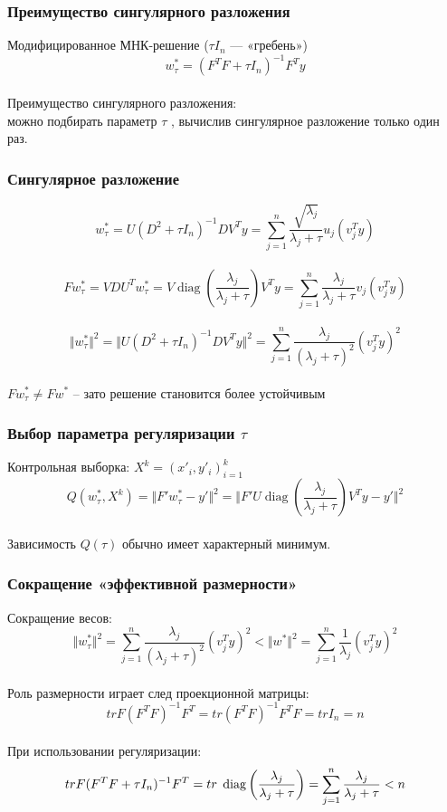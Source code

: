 \documentclass[10pt]{beamer}
\begin{document}
\begin{frame}\frametitle{Преимущество сингулярного разложения}
Модифицированное МНК-решение ($\tau I_n$ — «гребень»)\\
$$w^*_{\tau} = (F^TF + \tau I_n)^{-1}F^Ty$$\\
Преимущество сингулярного разложения:\\
можно подбирать параметр $\tau$ , вычислив сингулярное разложение только один раз.
\end{frame}

\begin{frame}\frametitle{Сингулярное разложение}
$$w_{\tau}^*= U(D^2 + \tau I_n)^{-1}DV^Ty = \sum\limits_{j=1}^n \frac{\sqrt{\lambda_j}}{\lambda_j + \tau} u_j(v_j^Ty)$$\\
$$Fw_{\tau}^* = VDU^Tw_{\tau}^* = V \operatorname{diag} \left(\frac{\lambda_j}{\lambda_j + \tau}\right) V^Ty = \sum\limits_{j=1}^n \frac{\lambda_j}{\lambda_j + \tau} v_j (v_j^Ty)$$\\
$$\Vert w_{\tau}^* \Vert^2 = \Vert U(D^2 + \tau I_n)^{-1} DV^T y \Vert^2 = \sum\limits_{j=1}^n \frac{\lambda_j}{(\lambda_j + \tau)^2} (v^T_j y)^2$$\\
$F w_{\tau}^* \neq Fw^*$ -- зато решение становится более устойчивым
\end{frame}

\begin{frame}\frametitle{Выбор параметра регуляризации $\tau$}
Контрольная выборка: $X^k = (x'_i, y'_i)_{i=1}^k$\\
$$Q(w_{\tau}^*,X^k) = \Vert F' w_{\tau}^* - y' \Vert^2 = \Vert F'U \operatorname{diag} \left(\frac{\lambda_j}{\lambda_j + \tau}\right) V^T y -y' \Vert^2$$\\
Зависимость $Q(\tau)$ обычно имеет характерный минимум.
\end{frame}

\begin{frame}\frametitle{Сокращение «эффективной размерности»}
Сокращение весов:\\
$$\Vert w_{\tau}^* \Vert^2 = \sum\limits_{j=1}^n \frac{\lambda_j}{(\lambda_j + \tau)^2} (v^T_j y)^2 < \Vert w^* \Vert^2  = \sum\limits_{j=1}^n \frac{1}{\lambda_j} (v_j^Ty)^2$$\\
Роль размерности играет след проекционной матрицы:\\
$$tr F(F^TF)^{-1}F^T = tr(F^TF)^{-1}F^TF = tr I_n = n$$\\
При использовании регуляризации:\\
$$tr F(F^TF + \tau I_n)^{-1}F^T = tr \hspace{1mm}  \operatorname{diag} \left(\frac{\lambda_j}{\lambda_j + \tau}\right)= \sum\limits_{j=1}^n \frac{\lambda_j}{\lambda_j + \tau } < n $$
\end{frame}
\end{document}
